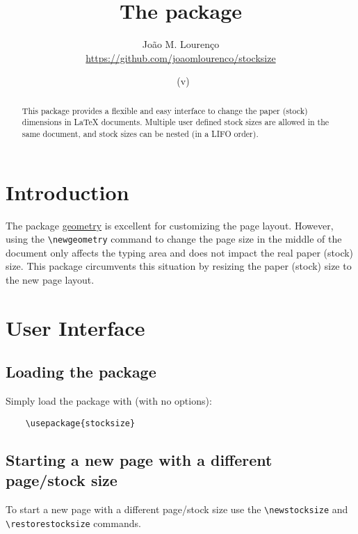 \documentclass[12pt,a4paper,article]{article}
\begin{document}
 
  
  \title{The \textsf{\filename} package}
  \author{João M. Lourenço\\\url{https://github.com/joaomlourenco/stocksize}}
  \date{\filedate\ (v\fileversion)}
  
  \maketitle
  
  \begin{abstract}
    This package provides a flexible and easy interface to change the paper (stock) dimensions in LaTeX documents.
    Multiple user defined stock sizes are allowed in the same document, and stock sizes can be nested (in a LIFO order).
  \end{abstract}

\section{Introduction}

  The package 
    \href{https://github.com/davidcarlisle/geometry}{geometry} 
is excellent for customizing the page layout. However, using the \verb!\newgeometry! command to change the page size in the middle of the document only affects the typing area and does not impact the real paper (stock) size. This package circumvents this situation by resizing the paper (stock) size to the new page layout.

\section{User Interface}
  
\subsection{Loading the package}
  
  Simply load the package with (with no options):
  
  \begin{verbatim}
    \usepackage{stocksize}
  \end{verbatim}
  
\subsection{Starting a new page with a different page/stock size}
  
To start a new page with a different page/stock size use the \verb!\newstocksize! and \verb!\restorestocksize! commands.
  
\end{document}
